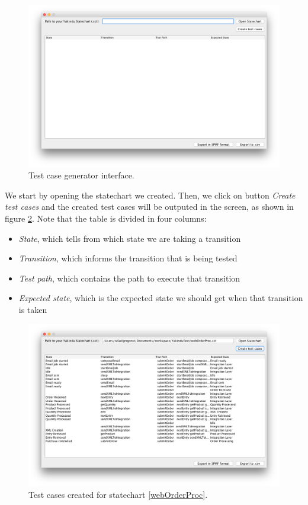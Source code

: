 \begin{figure}[htb]
\centering
\includegraphics[width=\textwidth]{figuras/testGenClean}
\caption{\label{testGenClean} Test case generator interface.}
\end{figure}

We start by opening the statechart we created. Then, we click on button \textit{Create test cases} and the created test cases will be outputed in the screen, as shown in figure \ref{testGenResults}. Note that the table is divided in four columns: 
\begin{itemize}
\item \textit{State}, which tells from which state we are taking a transition
\item \textit{Transition}, which informs the transition that is being tested 
\item \textit{Test path}, which contains the path to execute that transition
\item \textit{Expected state}, which is the expected state we should get when that transition is taken
\end{itemize}

\begin{figure}[htb]
\centering
\includegraphics[width=\textwidth]{figuras/testGenResults}
\caption{\label{testGenResults} Test cases created for statechart \ref{webOrderProc}.}
\end{figure}

